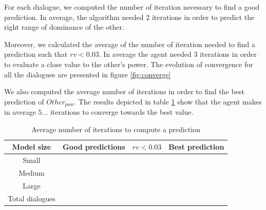 \documentclass[conference, letterpaper]{IEEEtran}
\begin{document}
For each dialogue, we computed the number of iteration necessary to find a good prediction. In average, the algorithm needed $2$ iterations in order to predict the right range of dominance of the other. 

Moreover, we calculated the average of the number of iteration needed to find a prediction such that $rv <0.03$. In average the agent needed 3 iterations in order to evaluate a close value to the other's power. The evolution of convergence for all the dialogues are presented in figure  \ref{fig:converge}

We  also computed the average number of iterations in order to find the best prediction of $Other_{pow}$. The results depicted in table \ref{tab:conv} show that the agent makes in average $5...$ iterations to converge towards the best value.  
\begin{table}[t]
	\begin{tabular}{|c|c|c|c|}
		\hline
		Model size & Good predictions & $rv <0.03$ & Best prediction \\
		\hline
		Small & & & \\
		\hline
		Medium & & & \\
		\hline
		Large & & & \\
		\hline
		Total dialogues & & & \\
		\hline
	\end{tabular}
	\caption{Average number of iterations to compute a prediction} 
	\label{tab:conv}
\end{table}

%			
\end{document}
